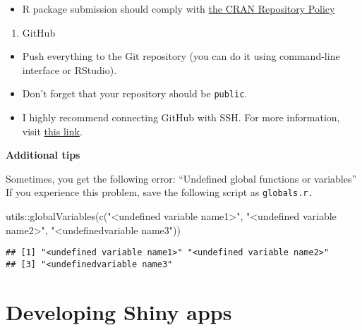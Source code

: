 \documentclass[
]{book}
\newenvironment{Shaded}{\begin{snugshade}}{\end{snugshade}}
\newcommand{\FunctionTok}[1]{\textcolor[rgb]{0.00,0.00,0.00}{#1}}
\newcommand{\NormalTok}[1]{#1}
\newcommand{\SpecialCharTok}[1]{\textcolor[rgb]{0.00,0.00,0.00}{#1}}
\newcommand{\StringTok}[1]{\textcolor[rgb]{0.31,0.60,0.02}{#1}}
\providecommand{\tightlist}{%
  \setlength{\itemsep}{0pt}\setlength{\parskip}{0pt}}
\begin{document}
\begin{itemize}
\tightlist
\item
  R package submission should comply with \href{https://cran.r-project.org/}{the CRAN Repository Policy}
\end{itemize}

\begin{enumerate}
\def\labelenumi{\arabic{enumi}.}
\setcounter{enumi}{1}
\tightlist
\item
  GitHub
\end{enumerate}

\begin{itemize}
\item
  Push everything to the Git repository (you can do it using command-line interface or RStudio).
\item
  Don't forget that your repository should be \texttt{public}.
\item
  I highly recommend connecting GitHub with SSH. For more information, visit \href{https://docs.github.com/en/github/authenticating-to-github/connecting-to-github-with-ssh}{this link}.
\end{itemize}

\textbf{Additional tips}

Sometimes, you get the following error: ``Undefined global functions or variables'' If you experience this problem, save the following script as \texttt{globals.r.}

\begin{Shaded}
\begin{Highlighting}[]
\NormalTok{utils}\SpecialCharTok{::}\FunctionTok{globalVariables}\NormalTok{(}\FunctionTok{c}\NormalTok{(}\StringTok{"\textless{}undefined variable name1\textgreater{}"}\NormalTok{, }\StringTok{"\textless{}undefined variable name2\textgreater{}"}\NormalTok{, }\StringTok{"\textless{}undefinedvariable name3"}\NormalTok{))}
\end{Highlighting}
\end{Shaded}

\begin{verbatim}
## [1] "<undefined variable name1>" "<undefined variable name2>"
## [3] "<undefinedvariable name3"
\end{verbatim}

\hypertarget{developing-shiny-apps}{%
\section{Developing Shiny apps}\label{developing-shiny-apps}}
\end{document}
